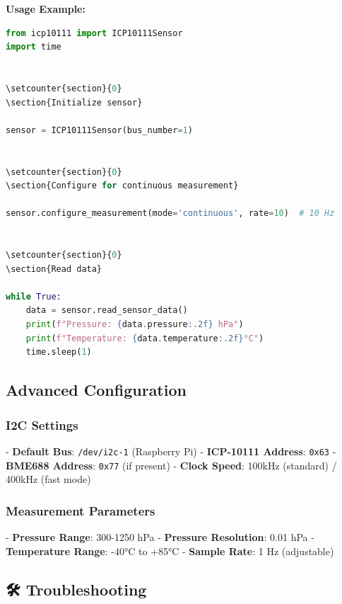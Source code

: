 \documentclass[11pt,a4paper]{article}
\begin{document}
\textbf{Usage Example:}
\begin{lstlisting}[language=python]
from icp10111 import ICP10111Sensor
import time


\setcounter{section}{0}
\section{Initialize sensor}

sensor = ICP10111Sensor(bus_number=1)


\setcounter{section}{0}
\section{Configure for continuous measurement}

sensor.configure_measurement(mode='continuous', rate=10)  # 10 Hz


\setcounter{section}{0}
\section{Read data}

while True:
    data = sensor.read_sensor_data()
    print(f"Pressure: {data.pressure:.2f} hPa")
    print(f"Temperature: {data.temperature:.2f}°C")
    time.sleep(1)
\end{lstlisting}

\subsection{Advanced Configuration}

\subsubsection{I2C Settings}
- \textbf{Default Bus}: \texttt{\footnotesize /dev/i2c-1} (Raspberry Pi)
- \textbf{ICP-10111 Address}: \texttt{\footnotesize 0x63}
- \textbf{BME688 Address}: \texttt{\footnotesize 0x77} (if present)
- \textbf{Clock Speed}: 100kHz (standard) / 400kHz (fast mode)

\subsubsection{Measurement Parameters}
- \textbf{Pressure Range}: 300-1250 hPa
- \textbf{Pressure Resolution}: 0.01 hPa
- \textbf{Temperature Range}: -40°C to +85°C
- \textbf{Sample Rate}: 1 Hz (adjustable)

\subsection{🛠️ Troubleshooting}
\end{document}
